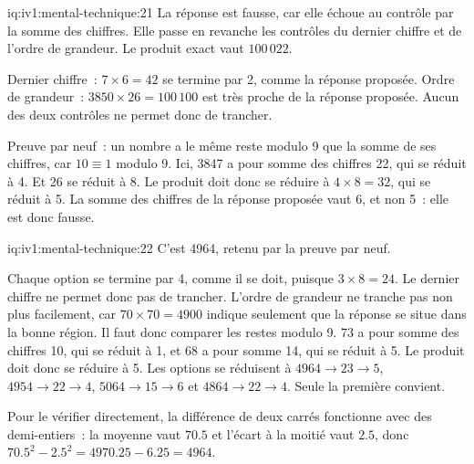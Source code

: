 \begin{solution}{iq:iv1:mental-technique:21}
La réponse est fausse, car elle échoue au contrôle par la somme des chiffres. Elle passe en revanche les contrôles du dernier chiffre et de l'ordre de grandeur. Le produit exact vaut $100\,022$.

Dernier chiffre~: $7 \times 6 = 42$ se termine par 2, comme la réponse proposée. Ordre de grandeur~: $3850 \times 26 = 100\,100$ est très proche de la réponse proposée. Aucun des deux contrôles ne permet donc de trancher.

Preuve par neuf~: un nombre a le même reste modulo 9 que la somme de ses chiffres, car $10 \equiv 1$ modulo 9. Ici, 3847 a pour somme des chiffres 22, qui se réduit à 4. Et 26 se réduit à 8. Le produit doit donc se réduire à $4 \times 8 = 32$, qui se réduit à 5. La somme des chiffres de la réponse proposée vaut 6, et non 5~: elle est donc fausse.

\end{solution}

\begin{solution}{iq:iv1:mental-technique:22}
C'est 4964, retenu par la preuve par neuf.

Chaque option se termine par 4, comme il se doit, puisque $3 \times 8 = 24$. Le dernier chiffre ne permet donc pas de trancher. L'ordre de grandeur ne tranche pas non plus facilement, car $70 \times 70 = 4900$ indique seulement que la réponse se situe dans la bonne région. Il faut donc comparer les restes modulo 9. 73 a pour somme des chiffres 10, qui se réduit à 1, et 68 a pour somme 14, qui se réduit à 5. Le produit doit donc se réduire à 5. Les options se réduisent à $4964 \to 23 \to 5$, $4954 \to 22 \to 4$, $5064 \to 15 \to 6$ et $4864 \to 22 \to 4$. Seule la première convient.

Pour le vérifier directement, la différence de deux carrés fonctionne avec des demi-entiers~: la moyenne vaut $70.5$ et l'écart à la moitié vaut $2.5$, donc $70.5^2 - 2.5^2 = 4970.25 - 6.25 = 4964$.

\end{solution}

